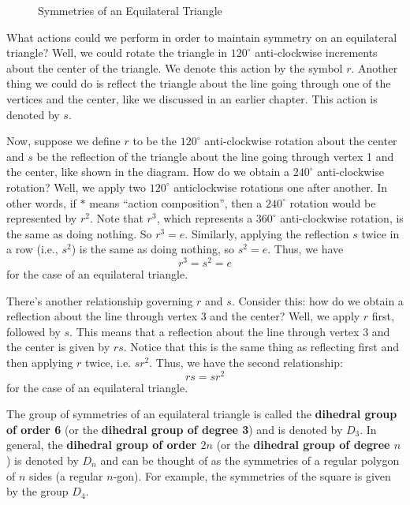 \begin{figure}[h]
    \centering
    \caption{Symmetries of an Equilateral Triangle}
\end{figure}

What actions could we perform in order to maintain symmetry on an equilateral triangle? Well, we could rotate the triangle in $120^\circ$ anti-clockwise increments about the center of the triangle. We denote this action by the symbol $r$. Another thing we could do is reflect the triangle about the line going through one of the vertices and the center, like we discussed in an earlier chapter. This action is denoted by $s$.

Now, suppose we define $r$ to be the $120^\circ$ anti-clockwise rotation about the center and $s$ be the reflection of the triangle about the line going through vertex 1 and the center, like shown in the diagram. How do we obtain a $240^\circ$ anti-clockwise rotation? Well, we apply two $120^\circ$ anticlockwise rotations one after another. In other words, if $\ast$ means ``action composition'', then a $240^\circ$ rotation would be represented by $r^2$. Note that $r^3$, which represents a $360^\circ$ anti-clockwise rotation, is the same as doing nothing. So $r^3 = e$. Similarly, applying the reflection $s$ twice in a row (i.e., $s^2$) is the same as doing nothing, so $s^2 = e$. Thus, we have
\[
    r^3 = s^2 = e
\]
for the case of an equilateral triangle.

There's another relationship governing $r$ and $s$. Consider this: how do we obtain a reflection about the line through vertex 3 and the center? Well, we apply $r$ first, followed by $s$. This means that a reflection about the line through vertex 3 and the center is given by $rs$. Notice that this is the same thing as reflecting first and then applying $r$ twice, i.e. $sr^2$. Thus, we have the second relationship:
\[
    rs = sr^2
\]
for the case of an equilateral triangle.

The group of symmetries of an equilateral triangle is called the \textbf{dihedral group of order 6} (or the \textbf{dihedral group of degree 3}) and is denoted by $D_3$. In general, the \textbf{dihedral group of order $2n$} (or the \textbf{dihedral group of degree $n$}) is denoted by $D_n$ and can be thought of as the symmetries of a regular polygon of $n$ sides (a regular $n$-gon). For example, the symmetries of the square is given by the group $D_4$.

